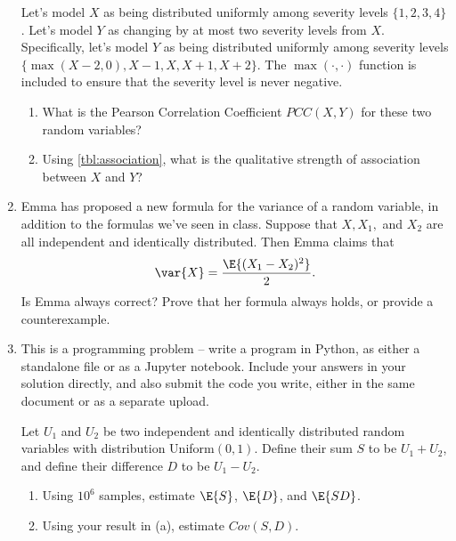 \documentclass{article}
\begin{document}
\begin{enumerate}
    Let's model $X$ as being distributed uniformly among severity levels $\{1, 2, 3, 4\}$.
    Let's model $Y$ as changing by at most two severity levels from $X$.
    Specifically, let's model $Y$ as being distributed uniformly among severity levels $\{\max(X-2, 0), X-1, X, X+1, X+2\}$.
    The $\max(\cdot, \cdot)$ function is included to ensure that the severity level is never negative.
    \begin{enumerate}
        \item What is the Pearson Correlation Coefficient $PCC(X, Y)$ for these two random variables?
        \item Using \cref{tbl:association}, what is the qualitative strength of association between $X$ and $Y$?
    \end{enumerate}
    \item Emma has proposed a new formula for the variance of a random variable, in addition to the formulas we've seen in class.
    Suppose that $X, X_1,$ and $X_2$ are all independent and identically distributed.
    Then Emma claims that
    \begin{align*}
        \var{X} = \frac{\E{(X_1 - X_2)^2}}{2}.
    \end{align*}
    Is Emma always correct? Prove that her formula always holds, or provide a counterexample.
    \item This is a programming problem -- write a program in Python, as either a standalone file or as a Jupyter notebook.
    Include your answers in your solution directly, and also submit the code you write, either in the same document or as a separate upload.
    
    Let $U_1$ and $U_2$ be two independent and identically distributed random variables with distribution Uniform$(0, 1)$.
    Define their sum $S$ to be $U_1 + U_2$,
    and define their difference $D$ to be $U_1 - U_2$.
    \begin{enumerate}
    \item Using $10^6$ samples, estimate $\E{S}$, $\E{D}$, and $\E{SD}$.
    \item Using your result in (a), estimate $Cov(S, D)$.
    \end{enumerate}
\end{enumerate}
\end{document}
